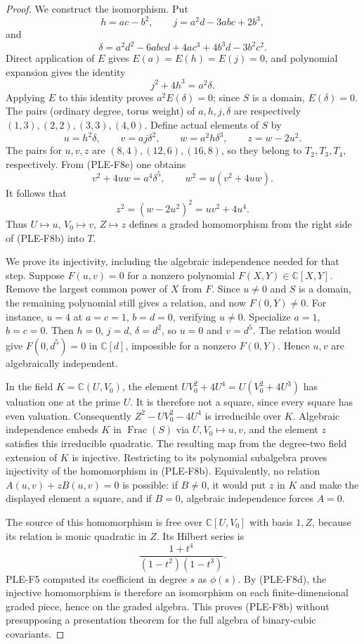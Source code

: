 \documentclass[11pt,a4paper]{article}
\begin{document}
\begin{proof}
We construct the isomorphism. Put
\[
 h=ac-b^2,\qquad
 j=a^2d-3abc+2b^3,
\]
and
\[
 \delta=a^2d^2-6abcd+4ac^3+4b^3d-3b^2c^2.
\]
Direct application of $E$ gives $E(a)=E(h)=E(j)=0$, and polynomial
expansion gives the identity
\[
 j^2+4h^3=a^2\delta.
 \tag{PLE-F8e}
\]
Applying $E$ to this identity proves $a^2E(\delta)=0$; since
$S$ is a domain, $E(\delta)=0$.
The pairs (ordinary degree, torus weight) of $a,h,j,\delta$ are
respectively $(1,3),(2,2),(3,3),(4,0)$.
Define actual elements of $S$ by
\[
 u=h^2\delta,\qquad
 v=aj\delta^2,\qquad
 w=a^2h\delta^3,\qquad z=w-2u^2.
\]
The pairs for $u,v,z$ are $(8,4),(12,6),(16,8)$, so they belong
to $T_2,T_3,T_4$, respectively. From (PLE-F8e) one obtains
\[
 v^2+4uw=a^4\delta^5,\qquad
 w^2=u(v^2+4uw).
\]
It follows that
\[
 z^2=(w-2u^2)^2=uv^2+4u^4.
 \tag{PLE-F8f}
\]
Thus $U\mapsto u$, $V_0\mapsto v$, $Z\mapsto z$ defines a graded
homomorphism from the right side of (PLE-F8b) into $T$.

We prove its injectivity, including the algebraic independence needed
for that step. Suppose $F(u,v)=0$ for a nonzero polynomial
$F(X,Y)\in\mathbb C[X,Y]$. Remove the largest common power of $X$
from $F$. Since $u\ne0$ and $S$ is a domain, the remaining polynomial
still gives a relation, and now $F(0,Y)\ne0$.
For instance, $u=4$ at $a=c=1$, $b=d=0$, verifying $u\ne0$.
Specialize $a=1$, $b=c=0$. Then $h=0$, $j=d$, $\delta=d^2$,
so $u=0$ and $v=d^5$. The relation would give
$F(0,d^5)=0$ in $\mathbb C[d]$, impossible for a nonzero
$F(0,Y)$. Hence $u,v$ are algebraically independent.

In the field $K=\mathbb C(U,V_0)$, the element
$UV_0^2+4U^4=U(V_0^2+4U^3)$ has valuation one at the prime $U$.
It is therefore not a square, since every square has even valuation.
Consequently $Z^2-UV_0^2-4U^4$ is irreducible over $K$.
Algebraic independence embeds $K$ in $\operatorname{Frac}(S)$ via
$U,V_0\mapsto u,v$, and the element $z$ satisfies this irreducible
quadratic. The resulting map from the degree-two field extension of
$K$ is injective. Restricting to its polynomial subalgebra proves
injectivity of the homomorphism in (PLE-F8b). Equivalently, no
relation $A(u,v)+zB(u,v)=0$ is possible: if $B\ne0$, it would put
$z$ in $K$ and make the displayed element a square, and if $B=0$,
algebraic independence forces $A=0$.

The source of this homomorphism is free over $\mathbb C[U,V_0]$
with basis $1,Z$, because its relation is monic quadratic in $Z$.
Its Hilbert series is
\[
 \frac{1+t^4}{(1-t^2)(1-t^3)}.
\]
PLE-F5 computed its coefficient in degree $s$ as $\phi(s)$.
By (PLE-F8d), the injective homomorphism is therefore an isomorphism
on each finite-dimensional graded piece, hence on the graded algebra.
This proves (PLE-F8b) without presupposing a presentation theorem
for the full algebra of binary-cubic covariants.


\end{proof}
\end{document}
